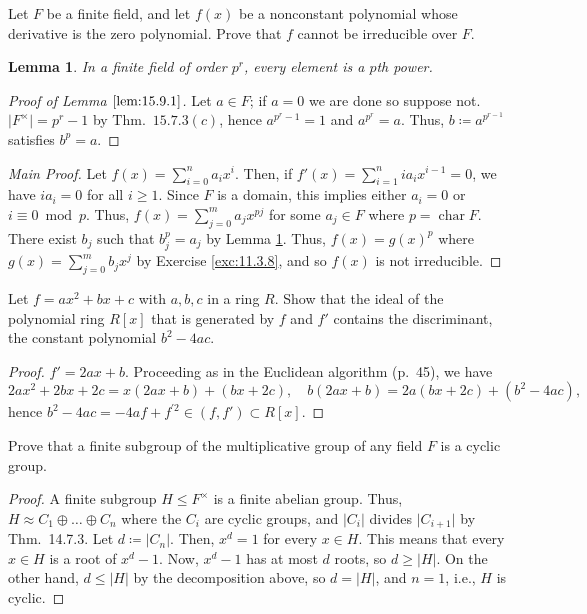 \documentclass[12pt]{article}
\newtheorem{lemma}{Lemma}[subsubsection]
\theoremstyle{remark}
\begin{document}
\setcounter{subsubsection}{9}
\begin{problem}
  Let $F$ be a finite field, and let $f(x)$ be a nonconstant polynomial whose derivative is the zero polynomial. Prove that $f$ cannot be irreducible over $F$.
\end{problem}
\begin{lemma}\label{lem:15.9.1}
  In a finite field of order $p^r$, every element is a $p$th power.
\end{lemma}
\begin{proof}[Proof of Lemma $\ref{lem:15.9.1}$]
  Let $a \in F$; if $a=0$ we are done so suppose not. $\lvert F^\times \rvert = p^r - 1$ by Thm.~$15.7.3(c)$, hence $a^{p^r-1} = 1$ and $a^{p^r} = a$. Thus, $b \coloneqq a^{p^{r-1}}$ satisfies $b^p = a$.
\end{proof}
\begin{proof}[Main Proof]
  Let $f(x) = \sum_{i=0}^n a_ix^i$. Then, if $f'(x) = \sum_{i=1}^n ia_ix^{i-1} = 0$, we have $ia_i = 0$ for all $i \ge 1$. Since $F$ is a domain, this implies either $a_i=0$ or $i \equiv 0 \bmod p$. Thus, $f(x) = \sum_{j=0}^m a_jx^{pj}$ for some $a_j \in F$ where $p = \operatorname{char}F$. There exist $b_j$ such that $b_j^p = a_j$ by Lemma \ref{lem:15.9.1}. Thus, $f(x) = g(x)^p$ where $g(x) = \sum_{j=0}^m b_jx^j$ by Exercise \ref{exc:11.3.8}, and so $f(x)$ is not irreducible.
\end{proof}

\begin{problem}
  Let $f = ax^2 + bx + c$ with $a, b, c$ in a ring $R$.  Show that the ideal of the polynomial ring $R[x]$ that is generated by $f$ and $f'$ contains the discriminant, the constant polynomial $b^2 - 4 a c$.
\end{problem}
\begin{proof}
  $f' = 2ax + b$. Proceeding as in the Euclidean algorithm (p.~45), we have
  \begin{equation*}
    2ax^2 + 2bx + 2c = x(2ax+b) + (bx + 2c),\quad b(2ax + b) = 2a(bx+2c) + (b^2 - 4ac),
  \end{equation*}
  hence $b^2 - 4ac = -4af + f^{\prime2} \in (f,f') \subset R[x]$.
\end{proof}

\setcounter{subsubsection}{12}
\begin{problem}
  Prove that a finite subgroup of the multiplicative group of any field $F$ is a cyclic group.
\end{problem}
\begin{proof}
  A finite subgroup $H \leqslant F^\times$ is a finite abelian group. Thus, $H \approx C_1 \oplus \dots \oplus C_n$ where the $C_i$ are cyclic groups, and $\lvert C_i \rvert$ divides $\lvert C_{i + 1}\rvert$ by Thm.~14.7.3. Let $d \coloneqq \lvert C_n\rvert$. Then, $x^d = 1$ for every $x \in H$. This means that every $x \in H$ is a root of $x^d - 1$. Now, $x^d - 1$ has at most $d$ roots, so $d\ge \lvert H\rvert$. On the other hand, $d\le \lvert H\rvert$ by the decomposition above, so $d = \lvert H \rvert$, and $n=1$, i.e., $H$ is cyclic.
\end{proof}
\end{document}
